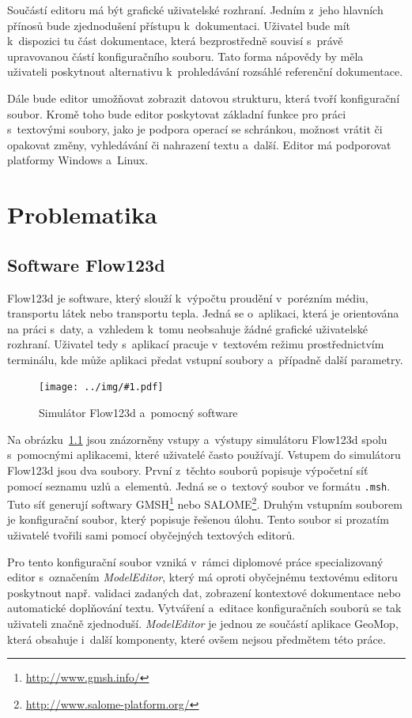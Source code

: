 \documentclass[FM,bw,DP]{tulthesis}
\newcommand{\includeimg}[2]{%
\begin{figure}[h]
	\centering
    \texttt{[image: ../img/\#1.pdf]}
    \caption{#2}
	\label{img:#1}
\end{figure}
}
\begin{document}
Součástí editoru má být grafické uživatelské rozhraní. Jedním z~jeho hlavních přínosů bude zjednodušení přístupu k~dokumentaci. Uživatel bude mít k~dispozici tu část dokumentace, která bezprostředně souvisí s~právě upravovanou částí konfiguračního souboru. Tato forma nápovědy by měla uživateli poskytnout alternativu k~prohledávání rozsáhlé referenční dokumentace.

Dále bude editor umožňovat zobrazit datovou strukturu, která tvoří konfigurační soubor. Kromě toho bude editor poskytovat základní funkce pro práci s~textovými soubory, jako je podpora operací se schránkou, možnost vrátit či opakovat změny, vyhledávání či nahrazení textu a~další. Editor má podporovat platformy Windows a~Linux.



\chapter{Problematika}

\section{Software Flow123d}

Flow123d je software, který slouží k~výpočtu proudění v~porézním médiu, transportu látek nebo transportu tepla. Jedná se o~aplikaci, která je orientována na práci s~daty, a~vzhledem k~tomu neobsahuje žádné grafické uživatelské rozhraní. Uživatel tedy s~aplikací pracuje v~textovém režimu prostřednictvím terminálu, kde může aplikaci předat vstupní soubory a~případně další parametry.

\includeimg{flow123d}{Simulátor Flow123d a~pomocný software}

Na obrázku~\ref{img:flow123d} jsou znázorněny vstupy a~výstupy simulátoru Flow123d spolu s~pomocnými aplikacemi, které uživatelé často používají. Vstupem do simulátoru Flow123d jsou dva soubory. První z~těchto souborů popisuje výpočetní síť pomocí seznamu uzlů a~elementů. Jedná se o~textový soubor ve formátu \texttt{.msh}. Tuto síť generují softwary GMSH\footnote{\url{http://www.gmsh.info/}} nebo SALOME\footnote{\url{http://www.salome-platform.org/}}. Druhým vstupním souborem je konfigurační soubor, který popisuje řešenou úlohu. Tento soubor si prozatím uživatelé tvořili sami pomocí obyčejných textových editorů.

Pro tento konfigurační soubor vzniká v~rámci diplomové práce specializovaný editor s~označením \textit{ModelEditor}, který má oproti obyčejnému textovému editoru poskytnout např. validaci zadaných dat, zobrazení kontextové dokumentace nebo automatické doplňování textu. Vytváření a~editace konfiguračních souborů se tak uživateli značně zjednoduší. \textit{ModelEditor} je jednou ze součástí aplikace GeoMop, která obsahuje i~další komponenty, které ovšem nejsou předmětem této práce.
\end{document}
